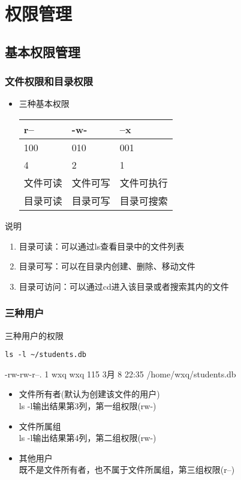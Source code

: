 \documentclass[xcolor=svgnames,presentation]{beamer}
\begin{document}
\section{权限管理}
\label{sec-2}
\subsection{基本权限管理}
\label{sec-2-1}
\begin{frame}
\frametitle{文件权限和目录权限}
\label{sec-2-1-1}
\begin{itemize}

\item 三种基本权限\\
\label{sec-2-1-1-1}%
\begin{center}
\begin{tabular}{lll}
 r--       &  -w-       &  --x         \\
\hline
 100       &  010       &  001         \\
 4         &  2         &  1           \\
 文件可读  &  文件可写  &  文件可执行  \\
 目录可读  &  目录可写  &  目录可搜索  \\
\end{tabular}
\end{center}


\end{itemize} %
\begin{block}{说明}
\label{sec-2-1-1-2}

\begin{enumerate}
\item 目录可读：可以通过ls查看目录中的文件列表
\item 目录可写：可以在目录内创建、删除、移动文件
\item 目录可访问：可以通过cd进入该目录或者搜索其内的文件
\end{enumerate}
\end{block}
\end{frame}
\begin{frame}[fragile]
\frametitle{三种用户}
\label{sec-2-1-2}
\begin{exampleblock}{三种用户的权限}
\label{sec-2-1-2-1}


\begin{verbatim}
ls -l ~/students.db
\end{verbatim}
-rw-rw-r--. 1 wxq wxq 115 3月   8 22:35 /home/wxq/students.db
\end{exampleblock}
\begin{itemize}

\item 文件所有者(默认为创建该文件的用户)\\
\label{sec-2-1-2-2}%
ls -l输出结果第3列，第一组权限(rw-)

\item 文件所属组\\
\label{sec-2-1-2-3}%
ls -l输出结果第4列，第二组权限(rw-)

\item 其他用户\\
\label{sec-2-1-2-4}%
既不是文件所有者，也不属于文件所属组，第三组权限(r--)
\end{itemize} %
\end{frame}
\end{document}
